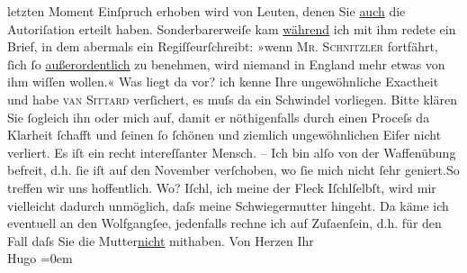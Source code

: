 \begin{ledgroupsized}[t]{13cm}
               letzten Moment Einſpruch erhoben wird von Leuten, denen Sie \uline{auch} die Autoriſation erteilt haben. Sonderbarerweiſe kam \uline{während} ich mit ihm redete ein Brief, in dem abermals ein
                  Regiſſeurſchreibt: »wenn \textsc{Mr.
                  Schnitzler} fortfährt, ſich ſo \uline{außerordentlich}
               zu benehmen, wird niemand in England mehr etwas von
               ihm wiſſen {\pb}wollen.« Was liegt da
               vor? ich kenne Ihre ungewöhnliche Exactheit und habe \textsc{van Sittard} verſichert, es muſs da ein
               Schwindel vorliegen. Bitte klären Sie ſogleich ihn oder mich auf, damit er
               nöthigenfalls durch einen Proceſs da Klarheit ſchafft und ſeinen ſo ſchönen und
               ziemlich ungewöhnlichen Eifer nicht verliert. Es iſt ein recht intereſſanter
               Mensch.\pend
           \pstart
           \centering{}{\pb}–\pend
           \pstart
           \noindent{}Ich bin alſo von der Waffenübung befreit, d.h. ſie iſt auf den November
               verſchoben, wo ſie mich nicht ſehr geniert.\hspace*{1.5em}So
               treffen wir uns hoffentlich. Wo? Iſchl, ich meine
               der Fleck Iſchlſelbſt, wird mir vielleicht dadurch unmöglich, daſs
               meine Schwiegermutter hingeht.
               Da käme ich eventuell an den Wolfgangſee,
               jedenfalls rechne ich auf Zuſa{\geminationm}enſein, d.h. für den Fall
               daſs Sie die Mutter\uline{nicht} mithaben.\pend
           \pstart
           Von Herzen Ihr{\\[\baselineskip]}\spacefill\mbox{Hugo}\pend
           \leftskip=0em{}\endnumbering{}\end{ledgroupsized}  \newcommand{\dateiname}{L01426}\newcommand{\titel}{Hugo von Hofmannsthal an Arthur Schnitzler, 12. 8. 1904}\newcommand{\editorInnen}{Martin Anton Müller und Gerd-Hermann Susen}
      